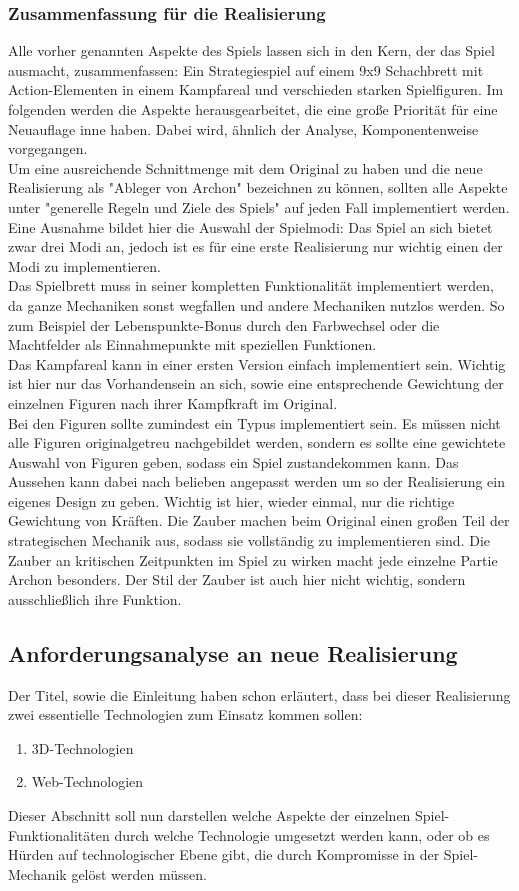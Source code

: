 \subsubsection{Zusammenfassung für die Realisierung}
Alle vorher genannten Aspekte des Spiels lassen sich in den Kern, der das Spiel ausmacht, zusammenfassen: Ein Strategiespiel auf einem 9x9 Schachbrett mit Action-Elementen in einem Kampfareal und verschieden starken Spielfiguren. Im folgenden werden die Aspekte herausgearbeitet, die eine große Priorität für eine Neuauflage inne haben. Dabei wird, ähnlich der Analyse, Komponentenweise vorgegangen.\\
Um eine ausreichende Schnittmenge mit dem Original zu haben und die neue Realisierung als "Ableger von Archon" bezeichnen zu können, sollten alle Aspekte unter "generelle Regeln und Ziele des Spiels" auf jeden Fall implementiert werden. Eine Ausnahme bildet hier die Auswahl der Spielmodi: Das Spiel an sich bietet zwar drei Modi an, jedoch ist es für eine erste Realisierung nur wichtig einen der Modi zu implementieren.\\
Das Spielbrett muss in seiner kompletten Funktionalität implementiert werden, da ganze Mechaniken sonst wegfallen und andere Mechaniken nutzlos werden. So zum Beispiel der Lebenspunkte-Bonus durch den Farbwechsel oder die Machtfelder als Einnahmepunkte mit speziellen Funktionen.\\
Das Kampfareal kann in einer ersten Version einfach implementiert sein. Wichtig ist hier nur das Vorhandensein an sich, sowie eine entsprechende Gewichtung der einzelnen Figuren nach ihrer Kampfkraft im Original.\\
Bei den Figuren sollte zumindest ein Typus implementiert sein. Es müssen nicht alle Figuren originalgetreu nachgebildet werden, sondern es sollte eine gewichtete Auswahl von Figuren geben, sodass ein Spiel zustandekommen kann. Das Aussehen kann dabei nach belieben angepasst werden um so der Realisierung ein eigenes Design zu geben. Wichtig ist hier, wieder einmal, nur die richtige Gewichtung von Kräften.
Die Zauber machen beim Original einen großen Teil der strategischen Mechanik aus, sodass sie vollständig zu implementieren sind. Die Zauber an kritischen Zeitpunkten im Spiel zu wirken macht jede einzelne Partie  Archon besonders. Der Stil der Zauber ist auch hier nicht wichtig, sondern ausschließlich ihre Funktion.
\subsection{Anforderungsanalyse an neue Realisierung}
\label{subsec:neueReal_analyse}
Der Titel, sowie die Einleitung haben schon erläutert, dass bei dieser Realisierung zwei essentielle Technologien zum Einsatz kommen sollen: 
\begin{enumerate}
	\item 3D-Technologien
	\item Web-Technologien
\end{enumerate}
Dieser Abschnitt soll nun darstellen welche Aspekte der einzelnen Spiel-Funktionalitäten durch welche Technologie umgesetzt werden kann, oder ob es \evtl Hürden auf technologischer Ebene gibt, die durch Kompromisse in der Spiel-Mechanik gelöst werden müssen.

